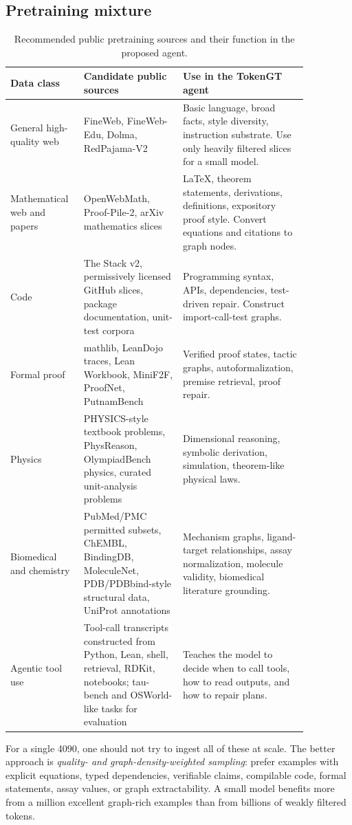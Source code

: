 \documentclass[11pt]{article}
\newcommand{\1}{\mathbf{1}}
\begin{document}
\subsection{Pretraining mixture}

\begin{longtable}{p{0.18\linewidth}p{0.30\linewidth}p{0.38\linewidth}}
\caption{Recommended public pretraining sources and their function in the proposed agent.}\label{tab:pretrain-sources}\\
\toprule
Data class & Candidate public sources & Use in the TokenGT agent\\
\midrule
General high-quality web & FineWeb, FineWeb-Edu, Dolma, RedPajama-V2 & Basic language, broad facts, style diversity, instruction substrate. Use only heavily filtered slices for a small model.\\
Mathematical web and papers & OpenWebMath, Proof-Pile-2, arXiv mathematics slices & LaTeX, theorem statements, derivations, definitions, expository proof style. Convert equations and citations to graph nodes.\\
Code & The Stack v2, permissively licensed GitHub slices, package documentation, unit-test corpora & Programming syntax, APIs, dependencies, test-driven repair. Construct import-call-test graphs.\\
Formal proof & mathlib, LeanDojo traces, Lean Workbook, MiniF2F, ProofNet, PutnamBench & Verified proof states, tactic graphs, autoformalization, premise retrieval, proof repair.\\
Physics & PHYSICS-style textbook problems, PhysReason, OlympiadBench physics, curated unit-analysis problems & Dimensional reasoning, symbolic derivation, simulation, theorem-like physical laws.\\
Biomedical and chemistry & PubMed/PMC permitted subsets, ChEMBL, BindingDB, MoleculeNet, PDB/PDBbind-style structural data, UniProt annotations & Mechanism graphs, ligand-target relationships, assay normalization, molecule validity, biomedical literature grounding.\\
Agentic tool use & Tool-call transcripts constructed from Python, Lean, shell, retrieval, RDKit, notebooks; tau-bench and OSWorld-like tasks for evaluation & Teaches the model to decide when to call tools, how to read outputs, and how to repair plans.\\
\bottomrule
\end{longtable}

For a single 4090, one should not try to ingest all of these at scale. The better approach is \emph{quality- and graph-density-weighted sampling}: prefer examples with explicit equations, typed dependencies, verifiable claims, compilable code, formal statements, assay values, or graph extractability. A small model benefits more from a million excellent graph-rich examples than from billions of weakly filtered tokens.
\end{document}
